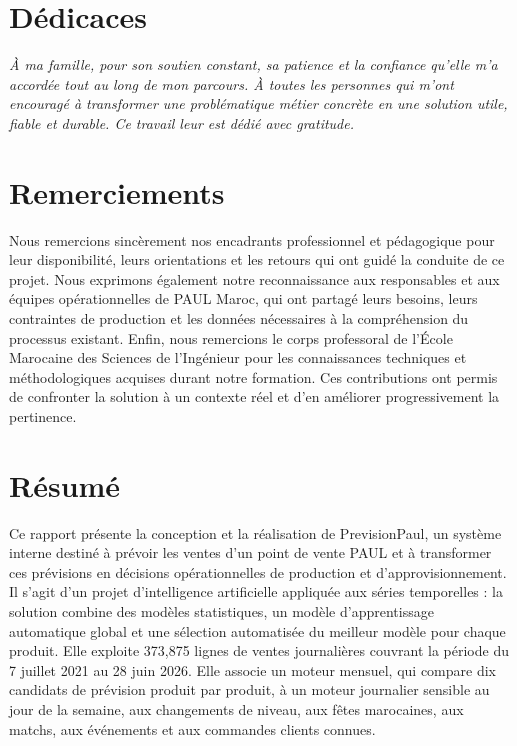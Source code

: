 \documentclass[12pt,a4paper,oneside]{report}
\newcommand{\NomProjet}{PrevisionPaul}
\newcommand{\OrganismeAccueil}{PAUL Maroc}
\begin{document}
\hypersetup{pageanchor=true}

\chapter*{Dédicaces}
\thispagestyle{plain}
\vspace*{2cm}
\begin{flushright}
\begin{minipage}{0.72\textwidth}
\itshape
À ma famille, pour son soutien constant, sa patience et la confiance qu'elle
m'a accordée tout au long de mon parcours. À toutes les personnes qui m'ont
encouragé à transformer une problématique métier concrète en une solution utile,
fiable et durable. Ce travail leur est dédié avec gratitude.
\end{minipage}
\end{flushright}

\clearpage
\chapter*{Remerciements}
\thispagestyle{plain}
Nous remercions sincèrement nos encadrants professionnel et pédagogique pour
leur disponibilité, leurs orientations et les retours qui ont guidé la conduite
de ce projet. Nous exprimons également notre reconnaissance aux responsables et
aux équipes opérationnelles de \OrganismeAccueil, qui ont partagé leurs besoins,
leurs contraintes de production et les données nécessaires à la compréhension du
processus existant. Enfin, nous remercions le corps professoral de l'École
Marocaine des Sciences de l'Ingénieur pour les connaissances techniques et
méthodologiques acquises durant notre formation. Ces contributions ont permis de
confronter la solution à un contexte réel et d'en améliorer progressivement la
pertinence.

\clearpage
\chapter*{Résumé}
Ce rapport présente la conception et la réalisation de \NomProjet, un système
interne destiné à prévoir les ventes d'un point de vente PAUL et à transformer
ces prévisions en décisions opérationnelles de production et
d'approvisionnement. Il s'agit d'un projet d'intelligence artificielle appliquée
aux séries temporelles : la solution combine des modèles statistiques, un modèle
d'apprentissage automatique global et une sélection automatisée du meilleur
modèle pour chaque produit. Elle exploite 373,875 lignes de ventes journalières
couvrant la période du 7 juillet 2021 au 28 juin 2026. Elle associe un moteur
mensuel, qui compare dix candidats de prévision produit par produit, à un moteur
journalier sensible au jour de la semaine, aux changements de niveau, aux fêtes
marocaines, aux matchs, aux événements et aux commandes clients connues.
\end{document}
